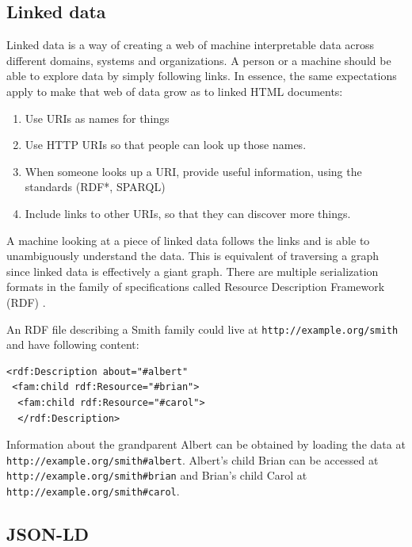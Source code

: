 \subsection{Linked data}\label{linkeddata}

Linked data is a way of creating a web of machine interpretable data across different domains, systems and organizations. A person or a machine should be able to explore data by simply following links. In essence, the same expectations apply to make that web of data grow as to linked HTML documents: \citep{linkedatafourrules}

\begin{enumerate}
  \item Use URIs as names for things
  \item Use HTTP URIs so that people can look up those names.
  \item When someone looks up a URI, provide useful information, using the standards (RDF*, SPARQL)
  \item Include links to other URIs, so that they can discover more things.
\end{enumerate}

A machine looking at a piece of linked data follows the links and is able to unambiguously understand the data. This is equivalent of traversing a graph since linked data is effectively a giant graph. There are multiple serialization formats in the family of specifications called Resource Description Framework (RDF) \citep{rdfspecification}.

An RDF file describing a Smith family could live at \lstinline{http://example.org/smith} and have following content:

\lstset{language=XML}
\begin{lstlisting}[caption= Simple example of a person as RDF, label=rdfexample]
<rdf:Description about="#albert"
 <fam:child rdf:Resource="#brian">
  <fam:child rdf:Resource="#carol">
  </rdf:Description>
\end{lstlisting}

Information about the grandparent Albert can be obtained by loading the data at \\ \lstinline{http://example.org/smith#albert}. Albert's child Brian can be accessed at \\  \lstinline{http://example.org/smith#brian} and Brian's child Carol at \lstinline{http://example.org/smith#carol}.

\subsection{JSON-LD}\label{jsonld}

